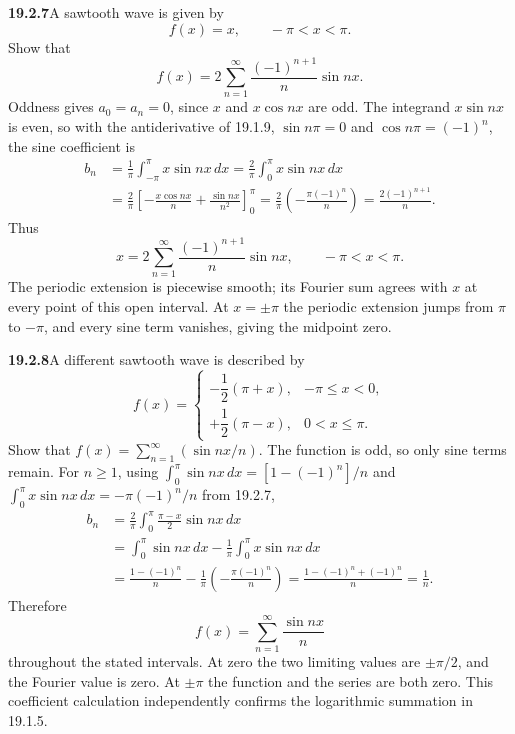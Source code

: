 \par\bigskip
\noindent\textbf{19.2.7}\quad A sawtooth wave is given by
\[
f(x)=x,\qquad-\pi<x<\pi.
\]
Show that
\[
f(x)=2\sum_{n=1}^{\infty}\frac{(-1)^{n+1}}{n}\sin nx.
\]
\solution
Oddness gives $a_0=a_n=0$, since $x$ and $x\cos nx$ are odd. The
integrand $x\sin nx$ is even, so with the antiderivative of 19.1.9,
$\sin n\pi=0$ and $\cos n\pi=(-1)^n$, the sine coefficient is
\begin{align*}
b_n&=\frac1\pi\int_{-\pi}^\pi x\sin nx\,dx
=\frac2\pi\int_0^\pi x\sin nx\,dx\\
&=\frac2\pi\left[-\frac{x\cos nx}{n}
+\frac{\sin nx}{n^2}\right]_0^\pi
=\frac2\pi\left(-\frac{\pi(-1)^n}{n}\right)
=\frac{2(-1)^{n+1}}n.
\end{align*}
Thus
\[
\boxed{x=2\sum_{n=1}^{\infty}\frac{(-1)^{n+1}}n\sin nx,
\qquad -\pi<x<\pi.}
\]
The periodic extension is piecewise smooth; its Fourier sum agrees
with $x$ at every point of this open interval. At $x=\pm\pi$ the
periodic extension jumps from $\pi$ to $-\pi$, and every sine term
vanishes, giving the midpoint zero.

\par\bigskip
\noindent\textbf{19.2.8}\quad A different sawtooth wave is
described by
\[
f(x)=\begin{cases}
-\dfrac{1}{2}(\pi+x), & -\pi\le x<0,\\[10pt]
+\dfrac{1}{2}(\pi-x), & 0<x\le\pi.
\end{cases}
\]
Show that $f(x)=\displaystyle\sum_{n=1}^{\infty}(\sin nx/n)$.
\solution
The function is odd, so only sine terms remain. For $n\ge1$, using
$\int_0^\pi\sin nx\,dx=[1-(-1)^n]/n$ and
$\int_0^\pi x\sin nx\,dx=-\pi(-1)^n/n$ from 19.2.7,
\begin{align*}
b_n&=\frac2\pi\int_0^\pi\frac{\pi-x}{2}\sin nx\,dx\\
&=\int_0^\pi\sin nx\,dx
-\frac1\pi\int_0^\pi x\sin nx\,dx\\
&=\frac{1-(-1)^n}{n}
-\frac1\pi\left(-\frac{\pi(-1)^n}{n}\right)
=\frac{1-(-1)^n+(-1)^n}{n}=\frac1n.
\end{align*}
Therefore
\[
\boxed{f(x)=\sum_{n=1}^{\infty}\frac{\sin nx}{n}}
\]
throughout the stated intervals. At zero the two limiting values are
$\pm\pi/2$, and the Fourier value is zero. At $\pm\pi$ the function
and the series are both zero. This coefficient calculation independently
confirms the logarithmic summation in 19.1.5.

